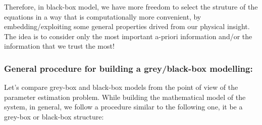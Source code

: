 \begin{itemize}
\begin{factbox}
    Therefore, in black-box model, we have more freedom to select the struture of the equations in a way that is computationally more convenient, by embedding/exploiting some general properties drived from our physical insight. 
The idea is to consider only the most important a-priori information and/or the information that we trust the most!
\end{factbox}

\end{itemize}

\subsubsection{General procedure for building a grey/black-box modelling:}
Let's compare grey-box and black-box models from the point of view of the parameter estimation problem. While building the mathematical model of the system, in general, we follow a procedure similar to the following one, it be a grey-box or black-box structure:\newline

